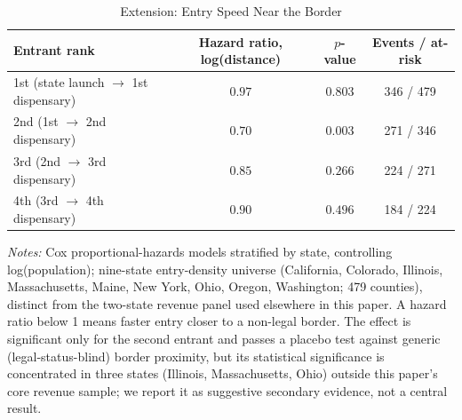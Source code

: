 \begin{table}[htbp]
\centering
\caption{Extension: Entry Speed Near the Border}
\label{tab:ae_hazard}
\small
\begin{tabular}{lccc}
\toprule
Entrant rank & Hazard ratio, log(distance) & $p$-value & Events / at-risk \\
\midrule
1st (state launch $\to$ 1st dispensary) & $0.97$ & $0.803$ & 346 / 479 \\
2nd (1st $\to$ 2nd dispensary) & $0.70$ & $0.003$ & 271 / 346 \\
3rd (2nd $\to$ 3rd dispensary) & $0.85$ & $0.266$ & 224 / 271 \\
4th (3rd $\to$ 4th dispensary) & $0.90$ & $0.496$ & 184 / 224 \\
\bottomrule
\end{tabular}
\begin{minipage}{0.95\textwidth}
\vspace{0.3em}
\footnotesize
\textit{Notes:} Cox proportional-hazards models stratified by state, controlling log(population); nine-state
entry-density universe (California, Colorado, Illinois, Massachusetts, Maine, New York, Ohio, Oregon,
Washington; 479 counties), distinct from the two-state revenue panel used elsewhere in this paper. A hazard
ratio below 1 means faster entry closer to a non-legal border. The effect is significant only for the second
entrant and passes a placebo test against generic (legal-status-blind) border proximity, but its statistical
significance is concentrated in three states (Illinois, Massachusetts, Ohio) outside this paper's core
revenue sample; we report it as suggestive secondary evidence, not a central result.
\end{minipage}
\end{table}
